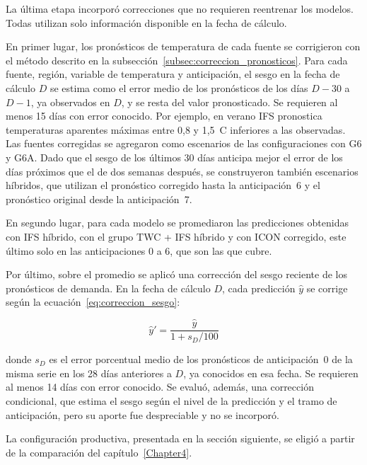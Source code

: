 La última etapa incorporó correcciones que no requieren reentrenar los modelos. Todas utilizan solo información disponible en la fecha de cálculo.

En primer lugar, los pronósticos de temperatura de cada fuente se corrigieron con el método descrito en la subsección~\ref{subsec:correccion_pronosticos}. Para cada fuente, región, variable de temperatura y anticipación, el sesgo en la fecha de cálculo $D$ se estima como el error medio de los pronósticos de los días $D-30$ a $D-1$, ya observados en $D$, y se resta del valor pronosticado. Se requieren al menos 15 días con error conocido. Por ejemplo, en verano IFS pronostica temperaturas aparentes máximas entre 0,8 y 1,5~\textdegree C inferiores a las observadas. Las fuentes corregidas se agregaron como escenarios de las configuraciones con G6 y G6A. Dado que el sesgo de los últimos 30 días anticipa mejor el error de los días próximos que el de dos semanas después, se construyeron también escenarios híbridos, que utilizan el pronóstico corregido hasta la anticipación~6 y el pronóstico original desde la anticipación~7.

En segundo lugar, para cada modelo se promediaron las predicciones obtenidas con IFS híbrido, con el grupo TWC + IFS híbrido y con ICON corregido, este último solo en las anticipaciones 0 a 6, que son las que cubre. 

Por último, sobre el promedio se aplicó una corrección del sesgo reciente de los pronósticos de demanda. En la fecha de cálculo $D$, cada predicción $\hat{y}$ se corrige según la ecuación~\ref{eq:correccion_sesgo}:

\begin{equation}
	\hat{y}' = \frac{\hat{y}}{1 + s_D / 100}
	\label{eq:correccion_sesgo}
\end{equation}

\noindent donde $s_D$ es el error porcentual medio de los pronósticos de anticipación~0 de la misma serie en los 28 días anteriores a $D$, ya conocidos en esa fecha. Se requieren al menos 14 días con error conocido. Se evaluó, además, una corrección condicional, que estima el sesgo según el nivel de la predicción y el tramo de anticipación, pero su aporte fue despreciable y no se incorporó.

La configuración productiva, presentada en la sección siguiente, se eligió a partir de la comparación del capítulo~\ref{Chapter4}.


